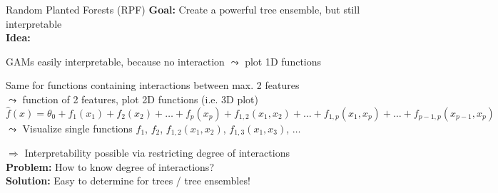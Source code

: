 \documentclass[10pt,compress,t,notes=noshow, xcolor=table]{beamer}
\begin{document}
%



\begin{framev}[align=top]{Random Planted Forests (RPF) %
}
\textbf{Goal:} Create a powerful tree ensemble, but still interpretable\\
\spacer[0.25]
\textbf{Idea:}
\begin{itemizeM}
\item GAMs easily interpretable, because no interaction $\leadsto$ plot 1D functions\\
\spacer[0.25]
\item Same for functions containing interactions between max. 2 features\\
$\leadsto$ function of 2 features, plot 2D functions (i.e. 3D plot)
$$
\hat{f}(x) = \theta_0 + f_1(x_1) + f_2(x_2) + \ldots + f_p(x_p) + f_{1,2}(x_1, x_2) + \ldots + f_{1,p}(x_1, x_p) + \ldots + f_{p-1,p}(x_{p-1}, x_p)
$$
$\leadsto$ Visualize single functions $f_1$, $f_2$, $f_{1,2}(x_1, x_2)$, $f_{1,3}(x_1, x_3)$, $\ldots$
\end{itemizeM}
$\Rightarrow$ Interpretability possible via restricting degree of interactions\\
\spacer[0.25]
\textbf{Problem:} How to know degree of interactions?\\
\spacer[0.25]
\textbf{Solution:} Easy to determine for trees / tree ensembles!
\end{framev}
\end{document}
